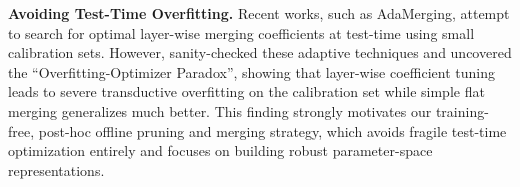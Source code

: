 \textbf{Avoiding Test-Time Overfitting.} Recent works, such as AdaMerging, attempt to search for optimal layer-wise merging coefficients at test-time using small calibration sets. However, \citet{adamerging2024sanity} sanity-checked these adaptive techniques and uncovered the ``Overfitting-Optimizer Paradox'', showing that layer-wise coefficient tuning leads to severe transductive overfitting on the calibration set while simple flat merging generalizes much better. This finding strongly motivates our training-free, post-hoc offline pruning and merging strategy, which avoids fragile test-time optimization entirely and focuses on building robust parameter-space representations.
